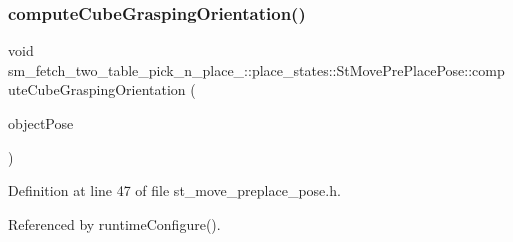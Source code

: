 \subsubsection{\texorpdfstring{compute\+Cube\+Grasping\+Orientation()}{computeCubeGraspingOrientation()}}
{\footnotesize\ttfamily void sm\+\_\+fetch\+\_\+two\+\_\+table\+\_\+pick\+\_\+n\+\_\+place\+\_\+::place\+\_\+states\+::\+St\+Move\+Pre\+Place\+Pose\+::compute\+Cube\+Grasping\+Orientation (\begin{DoxyParamCaption}\item[{geometry\+\_\+msgs\+::\+Pose\+Stamped \&}]{object\+Pose }\end{DoxyParamCaption})\hspace{0.3cm}{\ttfamily [inline]}}



Definition at line 47 of file st\+\_\+move\+\_\+preplace\+\_\+pose.\+h.



Referenced by runtime\+Configure().


